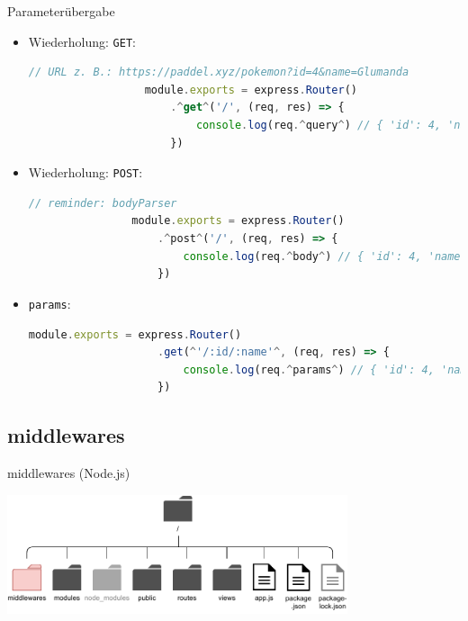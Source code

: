 \begin{bonus}{Parameterübergabe}
    \begin{itemize}
        \item Wiederholung: \texttt{GET}:

              \begin{lstlisting}[language=JavaScript]
                  // URL z. B.: https://paddel.xyz/pokemon?id=4&name=Glumanda
                  module.exports = express.Router()
                      .^get^('/', (req, res) => {
                          console.log(req.^query^) // { 'id': 4, 'name': 'Glumanda' }
                      })
              \end{lstlisting}
        \item Wiederholung: \texttt{POST}:

              \begin{lstlisting}[language=JavaScript]
                // reminder: bodyParser
                module.exports = express.Router()
                    .^post^('/', (req, res) => {
                        console.log(req.^body^) // { 'id': 4, 'name': 'Glumanda' }
                    })
            \end{lstlisting}
        \item \texttt{params}:

              \begin{lstlisting}[language=JavaScript]
                module.exports = express.Router()
                    .get(^'/:id/:name'^, (req, res) => {
                        console.log(req.^params^) // { 'id': 4, 'name': 'Glumanda' }
                    })
            \end{lstlisting}
    \end{itemize}
\end{bonus}

\subsection{middlewares}

\begin{bonus}{middlewares (Node.js)}
    \begin{center}
        \includegraphics[width=0.75\textwidth]{includes/figures/bonus_nodejs_middlewares.pdf}
    \end{center}
\end{bonus}

